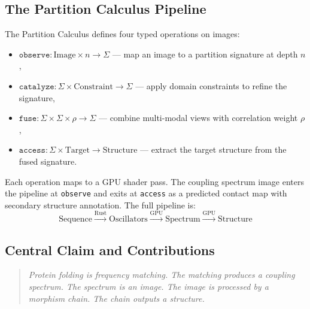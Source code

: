 \documentclass[11pt,twocolumn,a4paper]{article}
\theoremstyle{definition}
\theoremstyle{remark}
\newcommand{\Sig}{\Sigma}
\begin{document}
\subsection{The Partition Calculus Pipeline}

The Partition Calculus \citep{sachikonye2025_partition} defines four typed operations on images:
\begin{itemize}
    \item $\texttt{observe}: \mathrm{Image} \times n \to \Sig$ --- map an image to a partition signature at depth $n$,
    \item $\texttt{catalyze}: \Sig \times \mathrm{Constraint} \to \Sig$ --- apply domain constraints to refine the signature,
    \item $\texttt{fuse}: \Sig \times \Sig \times \rho \to \Sig$ --- combine multi-modal views with correlation weight $\rho$,
    \item $\texttt{access}: \Sig \times \mathrm{Target} \to \mathrm{Structure}$ --- extract the target structure from the fused signature.
\end{itemize}
Each operation maps to a GPU shader pass. The coupling spectrum image enters the pipeline at \texttt{observe} and exits at \texttt{access} as a predicted contact map with secondary structure annotation. The full pipeline is:
\begin{equation}
\label{eq:pipeline_intro}
\text{Sequence} \xrightarrow{\text{Rust}} \text{Oscillators} \xrightarrow{\text{GPU}} \text{Spectrum} \xrightarrow{\text{GPU}} \text{Structure}
\end{equation}

\subsection{Central Claim and Contributions}

\begin{quote}
\emph{Protein folding is frequency matching. The matching produces a coupling spectrum. The spectrum is an image. The image is processed by a morphism chain. The chain outputs a structure.}
\end{quote}
\end{document}
